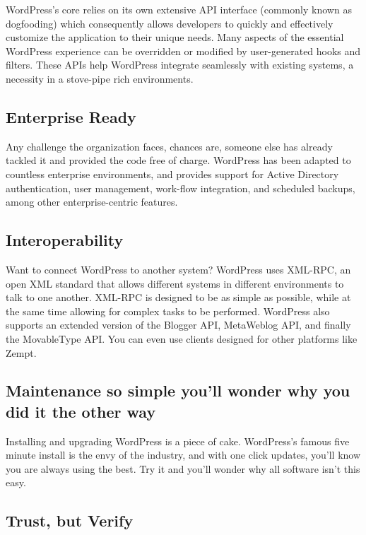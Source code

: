 WordPress’s core relies on its own extensive API interface (commonly known as dogfooding) which consequently allows developers to quickly and effectively customize the application to their unique needs. Many aspects of the essential WordPress experience can be overridden or modified by user-generated hooks and filters. These APIs help WordPress integrate seamlessly with existing systems, a necessity in a stove-pipe rich environments.

\subsection{Enterprise Ready}

Any challenge the organization faces, chances are, someone else has already tackled it and provided the code free of charge. WordPress has been adapted to countless enterprise environments, and provides support for Active Directory authentication, user management, work-flow integration, and scheduled backups, among other enterprise-centric features.

\subsection{Interoperability}

Want to connect WordPress to another system? WordPress uses XML-RPC, an open XML standard that allows different systems in different environments to talk to one another. XML-RPC is designed to be as simple as possible, while at the same time allowing for complex tasks to be performed. WordPress also supports an extended version of the Blogger API, MetaWeblog API, and finally the MovableType API. You can even use clients designed for other platforms like Zempt.

\subsection{Maintenance so simple you’ll wonder why you did it the other way}

Installing and upgrading WordPress is a piece of cake. WordPress’s famous five minute install is the envy of the industry, and with one click updates, you’ll know you are always using the best. Try it and you’ll wonder why all software isn’t this easy.

\subsection{Trust, but Verify}

